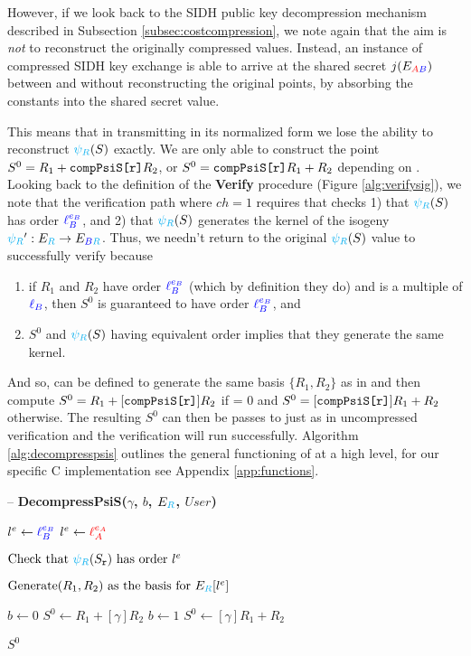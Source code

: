 However, if we look back to the SIDH public key decompression mechanism described in Subsection \ref{subsec:costcompression}, we note again that the aim is \textit{not} to reconstruct the originally compressed values. Instead, an instance of compressed SIDH key exchange is able to arrive at the shared secret $j(E_{\textcolor{red}{A}\textcolor{blue}{B}})$ between \alice and \bob without reconstructing the original points, by absorbing the constants into the shared secret value.

This means that in transmitting  in its normalized form we lose the ability to reconstruct $\textcolor{cyan}{\psi_R}(S)$ exactly. We are only able to construct the point $S^{0} = R_1 + \texttt{compPsiS[r]}R_2$, or $S^{0} = \texttt{compPsiS[r]}R_1 + R_2$ depending on . Looking back to the definition of the \textbf{Verify} procedure (Figure \ref{alg:verifysig}), we note that the verification path where $ch = 1$ requires that \alice checks 1) that $\textcolor{cyan}{\psi_R}(S)$ has order $\textcolor{blue}{\ell_{B}^{e_B}}$, and 2) that $\textcolor{cyan}{\psi_R}(S)$ generates the kernel of the isogeny $\textcolor{cyan}{\psi_R}' : E_{\textcolor{cyan}{R}} \rightarrow E_{\textcolor{blue}{B}\textcolor{cyan}{R}}$. Thus, we needn't return to the original $\textcolor{cyan}{\psi_R}(S)$ value to successfully verify because
\begin{enumerate}
\item if $R_1$ and $R_2$ have order $\textcolor{blue}{\ell_{B}^{e_B}}$ (which by definition they do) and  is a multiple of $\textcolor{blue}{\ell_{B}}$, then $S^{0}$ is guaranteed to have order $\textcolor{blue}{\ell_{B}^{e_B}}$, and
\item $S^{0}$ and $\textcolor{cyan}{\psi_R}(S)$ having equivalent order implies that they generate the same kernel.
\end{enumerate}

And so,  can be defined to generate the same basis $\{R_1, R_2\}$ as in  and then compute $S^{0} = R_1 + [\texttt{compPsiS[r]}]R_2$ if  = 0 and $S^{0} = [\texttt{compPsiS[r]}]R_1 + R_2$ otherwise. The resulting $S^{0}$ can then be passes to   just as in uncompressed verification and the verification will run successfully. Algorithm \ref{alg:decompresspsis} outlines the general functioning of  at a high level, for our specific C implementation see Appendix \ref{app:functions}.

\begin{algorithm}
\caption{-- \textbf{DecompressPsiS($\gamma$, $b$, $E_{\textcolor{cyan}{R}}$, $User$)}}
\label{alg:decompresspsis}
\begin{algorithmic}[1]
	\State $l^e \gets \textcolor{blue}{\ell_{B}^{e_B}}$
\EndIf
{}
	\State $l^e \gets \textcolor{red}{\ell_{A}^{e_A}}$
\EndIf

\State $\text{Check that } \textcolor{cyan}{\psi_R}(S_{\texttt{r}}) \text{ has order } l^e$

\State $\text{Generate} (R_{1}, R_{2}) \text{ as the basis for } E_{\textcolor{cyan}{R}}[l^e]$

	\State $b \gets 0$
	\State $S^{0} \gets R_1 + [\gamma]R_2$
\Else
	\State $b \gets 1$
	\State $S^{0} \gets [\gamma]R_1 + R_2$
\EndIf

\State \Return $S^{0}$
\end{algorithmic}
\end{algorithm}

